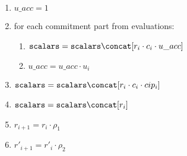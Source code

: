 \begin{algorithm}[H]
\begin{enumerate}
\begin{enumerate}
\begin{enumerate}
	   \end{enumerate}
	   \item $u\_acc = 1$
	   \item for each commitment part from evaluations:
            \begin{enumerate}
		\item $\texttt{scalars} = \texttt{scalars} \concat [r_i \cdot c_i \cdot u\_acc]$
		\item $u\_acc = u\_acc \cdot u_i$
	   \end{enumerate}
	  \item $\texttt{scalars} = \texttt{scalars} \concat [r_i \cdot c_i \cdot cip_i]$
	  \item $\texttt{scalars} = \texttt{scalars} \concat [r_i]$
            \item $r_{i + 1} = r_{i} \cdot \rho_1$
            \item $r'_{i + 1} = r'_{i} \cdot \rho_2$
        \end{enumerate}
    \end{enumerate}
\end{algorithm}

